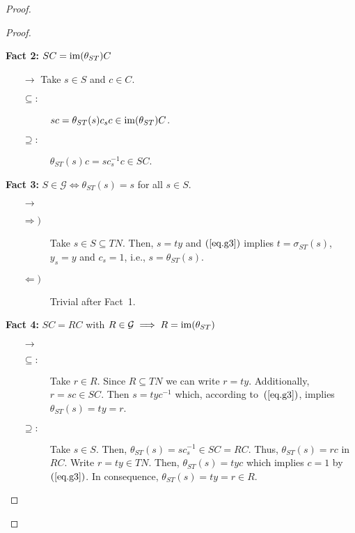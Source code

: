 \begin{solution}
\begin{proof}
\begin{proof}
\begin{enumerate}[\rm a)]
    \textbf{Fact 2:} $SC=\operatorname{im}(\theta_{ST})C$
    
    {\small
    \begin{enumerate}
        \item[$\to$]
        Take $s\in S$ and $c\in C$.
        \begin{description}
            \item[$\subseteq\colon$] $sc = \theta_{ST}(s)c_sc \in\operatorname{im}(\theta_{ST})C$.
            \item[$\supseteq\colon$] $\theta_{ST}(s)c = sc_s^{-1}c \in SC$.
        \end{description}
    \end{enumerate}
    }
    
    \textbf{Fact 3:} $S\in\mathcal G\iff \theta_{ST}(s)=s$ for all $s\in S$.

    {\small
    \begin{enumerate}
        \item[$\to$]
        \begin{description}
            \item[$\Rightarrow)$] Take $s\in S\subseteq TN$. Then, $s=ty$ and $(\ref{eq.g3})$ implies $t=\sigma_{ST}(s)$, $y_s=y$ and $c_s=1$, i.e., $s=\theta_{ST}(s)$.
            
            \item[$\Leftarrow)$] Trivial after Fact~1.
    
        \end{description}
    \end{enumerate}
    }

    \textbf{Fact 4:} $SC=RC$ with $R\in\mathcal G\implies R=\operatorname{im}(\theta_{ST})$
    
    {\small
    \begin{enumerate}
        \item[$\to$]
        \begin{description}
        \item[$\subseteq\colon$] Take $r\in R$. Since $R\subseteq TN$ we can write $r=ty$. Additionally, $r=sc\in SC$. Then $s=tyc^{-1}$ which, according to~$(\ref{eq.g3})$, implies $\theta_{ST}(s)=ty=r$.
        
        \item[$\supseteq\colon$] Take $s\in S$. Then, $\theta_{ST}(s)=sc_s^{-1}\in SC=RC$. Thus, $\theta_{ST}(s)=rc$ in~$RC$. Write $r=ty\in TN$. Then, $\theta_{ST}(s)=tyc$ which implies $c=1$ by~$(\ref{eq.g3})$. In consequence, $\theta_{ST}(s)=ty=r\in R$.
        \end{description}
    \end{enumerate}
    }


\end{enumerate}
\end{proof}
\end{proof}
\end{solution}

